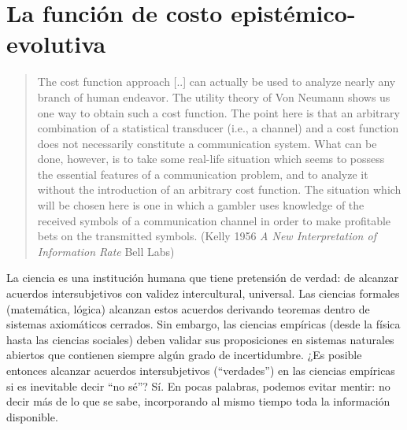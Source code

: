 \documentclass[a4paper,11pt]{book}
\theoremstyle{definition}
\begin{document}
\section{La función de costo epistémico-evolutiva}

\begin{quotation}
The cost function approach [..] can actually be used to analyze nearly any branch of human endeavor.
The utility theory of Von Neumann shows us one way to obtain such a cost function.
The point here is that an arbitrary combination of a statistical transducer (i.e., a channel) and a cost function does not necessarily constitute a communication system.
What can be done, however, is to take some real-life situation which seems to possess the essential features of a communication problem, and to analyze it without the introduction of an arbitrary cost function.
The situation which will be chosen here is one in which a gambler uses knowledge of the received symbols of a communication channel in order to make profitable bets on the transmitted symbols. (Kelly 1956 \emph{A New Interpretation of Information Rate} Bell Labs)
\end{quotation}

La ciencia es una institución humana que tiene pretensión de verdad: de alcanzar acuerdos intersubjetivos con validez intercultural, universal.
%
Las ciencias formales (matemática, lógica) alcanzan estos acuerdos derivando teoremas dentro de sistemas axiomáticos cerrados.
%
Sin embargo, las ciencias empíricas (desde la física hasta las ciencias sociales) deben validar sus proposiciones en sistemas naturales abiertos que contienen siempre algún grado de incertidumbre.
%
¿Es posible entonces alcanzar acuerdos intersubjetivos (``verdades'') en las ciencias empíricas si es inevitable decir ``no sé''?
%
Sí.
%
En pocas palabras, podemos evitar mentir: no decir más de lo que se sabe, incorporando al mismo tiempo toda la información disponible.

\end{document}
